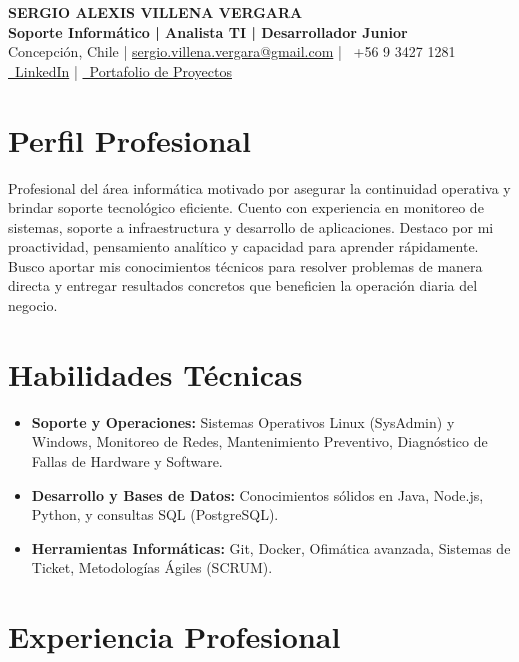 \documentclass[a4paper,10pt]{article}
\begin{document}
\begin{center}
    {\Huge \textbf{SERGIO ALEXIS VILLENA VERGARA}} \\[0.2cm]
    {\Large \textbf{Soporte Informático | Analista TI | Desarrollador Junior}} \\[0.2cm]
    \small
    \faMapMarker* Concepción, Chile \quad | \quad 
    \faEnvelope \href{mailto:sergio.villena.vergara@gmail.com}{ sergio.villena.vergara@gmail.com} \quad | \quad 
    \faPhone \ +56 9 3427 1281 \\
    \href{https://linkedin.com/in/sergio-villena}{\faLinkedin \ LinkedIn} \quad | \quad 
    \href{https://github.com/SAVillena}{\faGlobe \ Portafolio de Proyectos}
\end{center}

\section{Perfil Profesional}
Profesional del área informática motivado por asegurar la continuidad operativa y brindar soporte tecnológico eficiente. Cuento con experiencia en monitoreo de sistemas, soporte a infraestructura y desarrollo de aplicaciones. Destaco por mi proactividad, pensamiento analítico y capacidad para aprender rápidamente. Busco aportar mis conocimientos técnicos para resolver problemas de manera directa y entregar resultados concretos que beneficien la operación diaria del negocio.

\section{Habilidades Técnicas}
\begin{itemize}[leftmargin=*, noitemsep]
    \item \textbf{Soporte y Operaciones:} Sistemas Operativos Linux (SysAdmin) y Windows, Monitoreo de Redes, Mantenimiento Preventivo, Diagnóstico de Fallas de Hardware y Software.
    \item \textbf{Desarrollo y Bases de Datos:} Conocimientos sólidos en Java, Node.js, Python, y consultas SQL (PostgreSQL).
    \item \textbf{Herramientas Informáticas:} Git, Docker, Ofimática avanzada, Sistemas de Ticket, Metodologías Ágiles (SCRUM).
\end{itemize}

\section{Experiencia Profesional}
\end{document}

